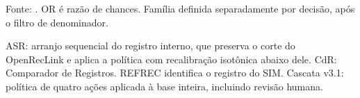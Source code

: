 \begin{table}[htbp]
\centering
\caption{Rejei\c{c}\~oes da hip\'otese de paridade (Benjamini-Hochberg, $\alpha = 0{,}05$, 26 testes): Arranjo ASR (vigil.), denominadores de pelo menos 30. $\Delta$ em pontos percentuais (grupo 1 menos grupo 2).}
\label{tab:equidade-den30-arranjo-P-vigilancia}
\small
{}
\par\footnotesize Fonte: . OR é razão de chances. Família definida separadamente por decisão, após o filtro de denominador.
\par\footnotesize ASR: arranjo sequencial do registro interno, que preserva o corte do OpenRecLink e aplica a política com recalibração isotônica abaixo dele. CdR: Comparador de Registros. REFREC identifica o registro do SIM. Cascata v3.1: política de quatro ações aplicada à base inteira, incluindo revisão humana.
\end{table}
